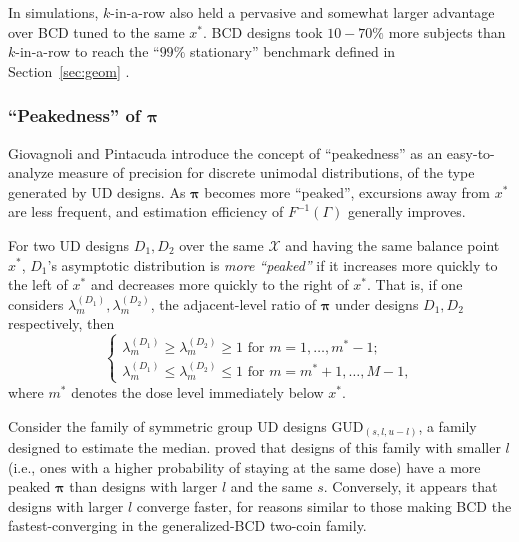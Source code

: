 In simulations, $k$-in-a-row also held a pervasive and somewhat larger advantage over BCD tuned to the same $x^*$. BCD designs took $10-70\%$ more subjects than $k$-in-a-row to reach the ``$99\%$ stationary'' benchmark defined in Section~\ref{sec:geom} \citep{Oron:Hoff:thek:2009}.

\subsubsection{``Peakedness'' of $\boldsymbol{\pi}$}

Giovagnoli and Pintacuda \citep{Giov:Pint:Pint:prop:1998} introduce the concept of ``peakedness'' as an easy-to-analyze measure of precision for discrete unimodal distributions, of the type generated by UD designs. As $\boldsymbol{\pi}$ becomes more ``peaked'', excursions away from $x^*$ are less frequent, and estimation efficiency of $F^{-1}\left(\Gamma\right)$ generally improves.

\begin{defn}\label{def:peak}
For two UD designs $D_1,D_2$ over the same $\mathcal{X}$ and having the same balance point $x^*$, $D_1$'s asymptotic distribution is \emph{more ``peaked''} if it increases more quickly to the left of $x^*$ and decreases more quickly to the right of $x^*$. That is, if one considers $\lambda^{(D_1)}_m,\lambda^{(D_2)}_m$, the adjacent-level ratio of $\boldsymbol{\pi}$ under designs $D_1,D_2$ respectively, then
\begin{equation}\label{eq:peakdef}
\begin{cases}
\lambda^{(D_1)}_{m}\ge\lambda^{(D_2)}_{m}\ge 1\textrm{ for }m=1,\ldots,m^*-1; \\
\lambda^{(D_1)}_{m}\le\lambda^{(D_2)}_{m} \le 1\textrm{ for }m = m^*+1,\ldots,M-1,
\end{cases}
\end{equation}
where $m^*$ denotes the dose level immediately below $x^*$.
\end{defn}

Consider the family of symmetric group UD designs GUD$_{(s,l,u-l)}$, a family designed to estimate the median. \cite{Oron07} proved that designs of this family with smaller $l$ (i.e., ones with a higher probability of staying at the same dose) have a more peaked $\boldsymbol{\pi}$ than designs with larger $l$ and the same $s$. Conversely, it appears that designs with larger $l$ converge faster, for reasons similar to those making BCD the fastest-converging in the generalized-BCD two-coin family.


